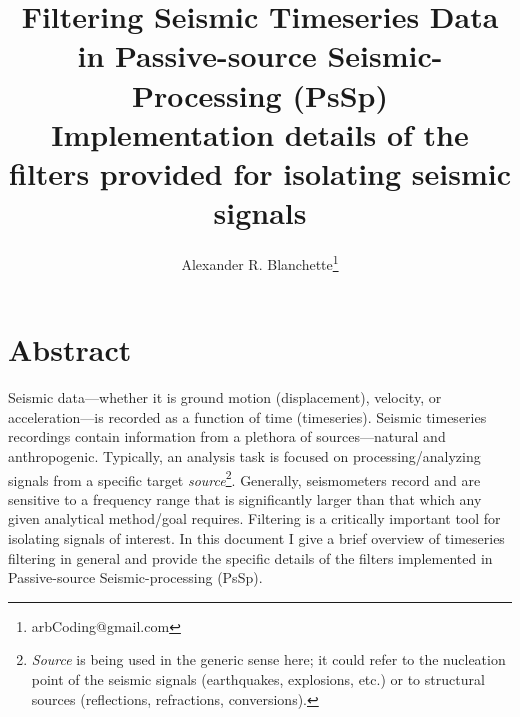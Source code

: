 \documentclass[american, twoside]{article}
\title{\Huge Filtering Seismic Timeseries Data in Passive-source Seismic-Processing (PsSp)\\
\large Implementation details of the filters provided for isolating seismic signals}
\author{Alexander R. Blanchette\thanks{arbCoding@gmail.com}}
\date{\Today}
\begin{document}
\maketitle
\pagestyle{fancy}
\section*{Abstract} \label{Abstract}
Seismic data---whether it is ground motion (displacement), velocity, or acceleration---is recorded as a function of time (timeseries). Seismic timeseries
recordings contain information from a plethora of sources---natural and anthropogenic. Typically, an analysis task is focused on processing/analyzing
signals from a specific target \textit{source}\footnote{\textit{Source} is being used in the generic sense here; it could refer to the nucleation point of the seismic
signals (earthquakes, explosions, etc.) or to structural sources (reflections, refractions, conversions).}. Generally, seismometers record and are sensitive
to a frequency range that is significantly larger than that which any given analytical method/goal requires. Filtering is a critically important tool for
isolating signals of interest. In this document I give a brief overview of timeseries filtering in general and provide the specific details of the filters
implemented in Passive-source Seismic-processing (PsSp).

\newpage
\begin{tcolorbox}
    \renewcommand\cftsecfont{\large}
    \renewcommand\cftsecpagefont{\small}
    \tableofcontents
\end{tcolorbox}

\end{document}

